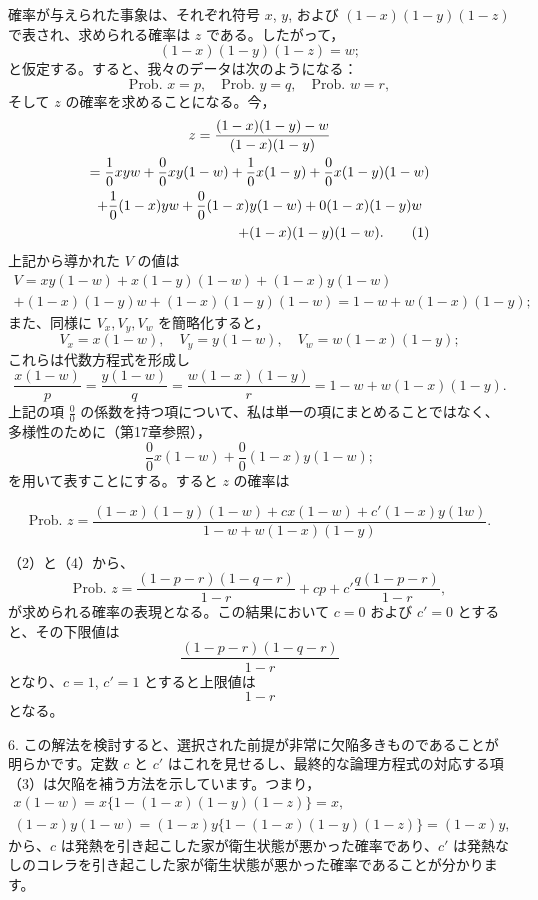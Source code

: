 \documentclass[a4paper,11pt,openany]{ltjsbook}
\begin{document}
確率が与えられた事象は、それぞれ符号 $x$, $y$, および $(1-x)(1-y)(1-z)$ で表され、求められる確率は $z$ である。したがって，
\[
(1-x)(1-y)(1-z) = w;
\]
と仮定する。すると、我々のデータは次のようになる：
\[
\text{Prob. } x = p,\quad \text{Prob. } y = q,\quad \text{Prob. } w = r,
\]
そして $z$ の確率を求めることになる。今，
\begin{multline}
z = \frac{(1-x)(1-y)-w}{(1-x)(1-y)} \\
= \frac{1}{0}xyw + \frac{0}{0}xy(1-w) + \frac{1}{0}x(1-y) + \frac{0}{0}x(1-y)(1-w) \\
+ \frac{1}{0}(1-x)yw + \frac{0}{0}(1-x)y(1-w) + 0(1-x)(1-y)w \\
\hfill + (1-x)(1-y)(1-w). \tag{1}
\end{multline}
上記から導かれた $V$ の値は
\[
\begin{array}{cccccc}
V = xy(1-w) + x(1-y)(1-w) + (1-x)y(1-w) \\
+ (1-x)(1-y)w + (1-x)(1-y)(1-w) = 1-w+w(1-x)(1-y);
\end{array}
\]
また、同様に $V_x, V_y, V_w$ を簡略化すると，
\[
V_x = x(1-w),\quad V_y = y(1-w), \quad V_w = w(1-x)(1-y);
\]
これらは代数方程式を形成し
\[
\frac{x(1-w)}{p} = \frac{y(1-w)}{q} = \frac{w(1-x)(1-y)}{r} = 1 - w + w(1-x)(1-y). \tag{2}
\]
上記の項 $\frac{0}{0}$ の係数を持つ項について、私は単一の項にまとめることではなく、多様性のために（第17章参照），
\[
\frac{0}{0}x(1-w) + \frac{0}{0}(1-x)y(1-w); \tag{3}
\]
を用いて表すことにする。すると $z$ の確率は


\[
\textrm{Prob. }z = \frac{(1-x)(1-y)(1-w) + cx(1-w) + c'(1-x)y(1w)}
                        {1 - w + w(1 - x)(1 - y)}. \tag{4}
\]

（2）と（4）から、
\[
\textrm{Prob. }z = \frac{(1-p-r)(1-q-r)}{1-r}
+ cp + c'\frac{q(1-p-r)}{1-r},
\]
が求められる確率の表現となる。この結果において $c = 0$ および $c' = 0$ とすると、その下限値は
\[
\frac{(1-p-r)(1-q-r)}{1-r}
\]
となり、$c=1$, $c'=1$ とすると上限値は
\[
1-r
\]
となる。

6. この解法を検討すると、選択された前提が非常に欠陥多きものであることが明らかです。定数 $c$ と $c'$ はこれを見せるし、最終的な論理方程式の対応する項（3）は欠陥を補う方法を示しています。つまり，
\[
\begin{array}{cccccc}
x(1-w) = x \{1 - (1-x)(1-y)(1-z)\} = x, \\
(1-x)y(1-w) = (1-x)y \{1 - (1-x)(1-y)(1-z)\} = (1-x)y,
\end{array}
\]
から、$c$ は発熱を引き起こした家が衛生状態が悪かった確率であり、$c'$ は発熱なしのコレラを引き起こした家が衛生状態が悪かった確率であることが分かります。
\end{document}
